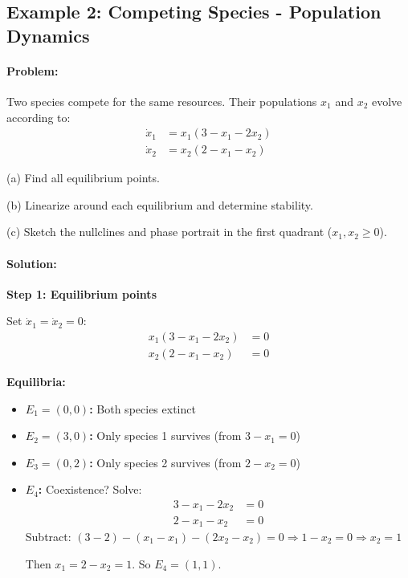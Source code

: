 \documentclass[11pt,a4paper]{article}
\begin{document}
\subsection{Example 2: Competing Species - Population Dynamics}

\paragraph{Problem:} Two species compete for the same resources. Their populations $x_1$ and $x_2$ evolve according to:
\begin{align}
\dot{x}_1 &= x_1(3 - x_1 - 2x_2) \\
\dot{x}_2 &= x_2(2 - x_1 - x_2)
\end{align}

(a) Find all equilibrium points.

(b) Linearize around each equilibrium and determine stability.

(c) Sketch the nullclines and phase portrait in the first quadrant ($x_1, x_2 \geq 0$).

\paragraph{Solution:}

\textbf{Step 1: Equilibrium points}

Set $\dot{x}_1 = \dot{x}_2 = 0$:
\begin{align}
x_1(3 - x_1 - 2x_2) &= 0 \\
x_2(2 - x_1 - x_2) &= 0
\end{align}

\textbf{Equilibria:}
\begin{itemize}
\item \textbf{$E_1 = (0, 0)$:} Both species extinct
\item \textbf{$E_2 = (3, 0)$:} Only species 1 survives (from $3 - x_1 = 0$)
\item \textbf{$E_3 = (0, 2)$:} Only species 2 survives (from $2 - x_2 = 0$)
\item \textbf{$E_4$:} Coexistence? Solve:
\begin{align}
3 - x_1 - 2x_2 &= 0 \\
2 - x_1 - x_2 &= 0
\end{align}
Subtract: $(3-2) - (x_1 - x_1) - (2x_2 - x_2) = 0 \Rightarrow 1 - x_2 = 0 \Rightarrow x_2 = 1$

Then $x_1 = 2 - x_2 = 1$. So $E_4 = (1, 1)$.
\end{itemize}
\end{document}
